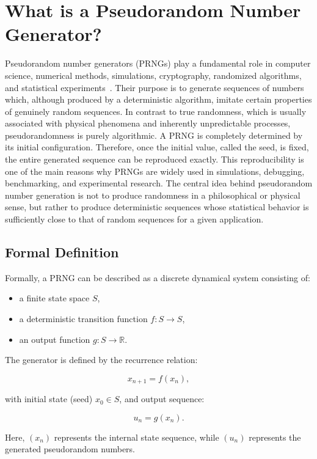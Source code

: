\section{What is a Pseudorandom Number Generator?}

Pseudorandom number generators (PRNGs) play a fundamental role in computer science, numerical methods, simulations, cryptography, randomized algorithms, and statistical experiments~\cite{knuth1997art,lecuyer2007testu01}. Their purpose is to generate sequences of numbers which, although produced by a deterministic algorithm, imitate certain properties of genuinely random sequences. In contrast to true randomness, which is usually associated with physical phenomena and inherently unpredictable processes, pseudorandomness is purely algorithmic. A PRNG is completely determined by its initial configuration. Therefore, once the initial value, called the seed, is fixed, the entire generated sequence can be reproduced exactly. This reproducibility is one of the main reasons why PRNGs are widely used in simulations, debugging, benchmarking, and experimental research. The central idea behind pseudorandom number generation is not to produce randomness in a philosophical or physical sense, but rather to produce deterministic sequences whose statistical behavior is sufficiently close to that of random sequences for a given application.

\subsection{Formal Definition}

Formally, a PRNG can be described as a discrete dynamical system consisting of:

\begin{itemize}
    \item a finite state space $S$,
    \item a deterministic transition function $f : S \to S$,
    \item an output function $g : S \to \mathbb{R}$.
\end{itemize}

The generator is defined by the recurrence relation:

$$
x_{n+1} = f(x_n),
$$

with initial state (seed) $x_0 \in S$, and output sequence:

$$
u_n = g(x_n).
$$

Here, $(x_n)$ represents the internal state sequence, while $(u_n)$ represents the generated pseudorandom numbers.

